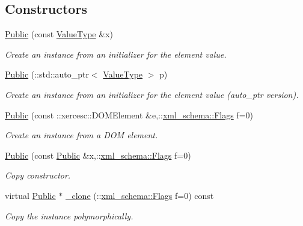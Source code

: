 \subsection*{Constructors}
\begin{DoxyCompactItemize}
\item 
\hyperlink{classopenstack_1_1xml_1_1Public_a46837919f66dd68d2c15f2bc01f4a190}{Public} (const \hyperlink{classopenstack_1_1xml_1_1AddressList}{ValueType} \&x)
\begin{DoxyCompactList}\small\item\em Create an instance from an initializer for the element value. \item\end{DoxyCompactList}\item 
\hyperlink{classopenstack_1_1xml_1_1Public_ad2ac3272689db730a9e9998a4adf0fb3}{Public} (::std::auto\_\-ptr$<$ \hyperlink{classopenstack_1_1xml_1_1AddressList}{ValueType} $>$ p)
\begin{DoxyCompactList}\small\item\em Create an instance from an initializer for the element value (auto\_\-ptr version). \item\end{DoxyCompactList}\item 
\hyperlink{classopenstack_1_1xml_1_1Public_a98ac24d175342affb50737159d896439}{Public} (const ::xercesc::DOMElement \&e,::\hyperlink{namespacexml__schema_affb4c227cbd9aa7453dd1dc5a1401943}{xml\_\-schema::Flags} f=0)
\begin{DoxyCompactList}\small\item\em Create an instance from a DOM element. \item\end{DoxyCompactList}\item 
\hyperlink{classopenstack_1_1xml_1_1Public_adf1b0a84b499418271920238b2e71ebf}{Public} (const \hyperlink{classopenstack_1_1xml_1_1Public}{Public} \&x,::\hyperlink{namespacexml__schema_affb4c227cbd9aa7453dd1dc5a1401943}{xml\_\-schema::Flags} f=0)
\begin{DoxyCompactList}\small\item\em Copy constructor. \item\end{DoxyCompactList}\item 
virtual \hyperlink{classopenstack_1_1xml_1_1Public}{Public} $\ast$ \hyperlink{classopenstack_1_1xml_1_1Public_a50aa65cd3bde2c0bc8bd1d72fb45f403}{\_\-clone} (::\hyperlink{namespacexml__schema_affb4c227cbd9aa7453dd1dc5a1401943}{xml\_\-schema::Flags} f=0) const 
\begin{DoxyCompactList}\small\item\em Copy the instance polymorphically. \item\end{DoxyCompactList}\end{DoxyCompactItemize}
